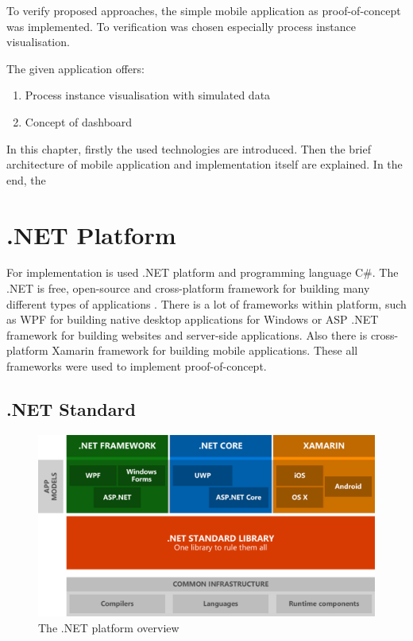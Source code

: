 To verify proposed approaches, the simple mobile application as proof-of-concept was implemented. To verification was chosen especially process instance visualisation.

The given application offers:
\begin{enumerate}
\item Process instance visualisation with simulated data
\item Concept of dashboard
\end{enumerate}

In this chapter, firstly the used technologies are introduced. Then the brief architecture of mobile application and implementation itself are explained. In the end, the
\section{.NET Platform}

For implementation is used .NET platform and programming language C\#. The .NET is free, open-source and cross-platform framework for building many different types of applications . There is a lot of frameworks within platform, such as WPF for building native desktop applications for Windows or ASP .NET framework for building websites and server-side applications. Also there is cross-platform Xamarin framework for building mobile applications. These all frameworks were used to implement proof-of-concept. 
\subsection{.NET Standard}
\begin{figure}[ht!]
\centering
\includegraphics[width=12cm,keepaspectratio]{img/dotnet-overview}
\caption{The .NET platform overview \cite{introducing-dotnet-standard}}
\label{fig:dotnet-overview}
\end{figure}

